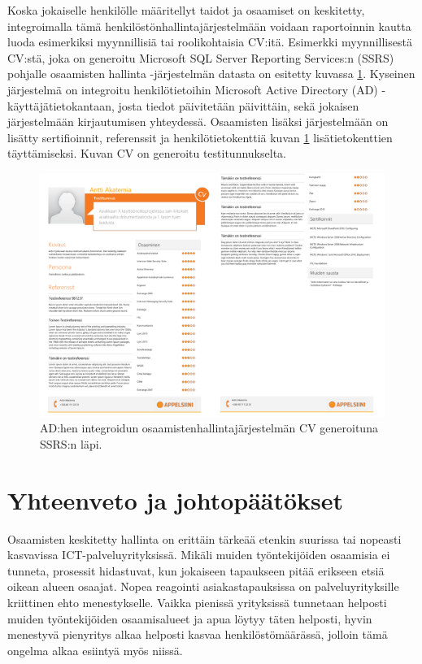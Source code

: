 \documentclass[a4paper,finnish,12pt]{article}
\begin{document}
Koska jokaiselle henkilölle määritellyt taidot ja osaamiset on keskitetty, integroimalla tämä henkilöstönhallintajärjestelmään voidaan raportoinnin kautta luoda esimerkiksi myynnillisiä tai roolikohtaisia CV:itä. Esimerkki myynnillisestä CV:stä, joka on generoitu Microsoft SQL Server Reporting Services:n (SSRS) pohjalle osaamisten hallinta -järjestelmän datasta on esitetty kuvassa \ref{fig:sampleCV}. Kyseinen järjestelmä on integroitu henkilötietoihin Microsoft Active Directory (AD) -käyttäjätietokantaan, josta tiedot päivitetään päivittäin, sekä jokaisen järjestelmään kirjautumisen yhteydessä. Osaamisten lisäksi järjestelmään on lisätty sertifioinnit, referenssit ja henkilötietokenttiä kuvan \ref{fig:sampleCV} lisätietokenttien täyttämiseksi. Kuvan CV on generoitu testitunnukselta.

\begin{figure}
\centering
\includegraphics[width=1\textwidth]{Akatemia_sampleCV.png}
\caption{AD:hen integroidun osaamistenhallintajärjestelmän CV generoituna SSRS:n läpi.}
\label{fig:sampleCV}
\end{figure}

\clearpage

\section{Yhteenveto ja johtopäätökset}

Osaamisten keskitetty hallinta on erittäin tärkeää etenkin suurissa tai nopeasti kasvavissa ICT-palveluyrityksissä. Mikäli muiden työntekijöiden osaamisia ei tunneta, prosessit hidastuvat, kun jokaiseen tapaukseen pitää erikseen etsiä oikean alueen osaajat. Nopea reagointi asiakastapauksissa on palveluyrityksille kriittinen ehto menestykselle. Vaikka pienissä yrityksissä tunnetaan helposti muiden työntekijöiden osaamisalueet ja apua löytyy täten helposti, hyvin menestyvä pienyritys alkaa helposti kasvaa henkilöstömäärässä, jolloin tämä ongelma alkaa esiintyä myös niissä.
\end{document}
